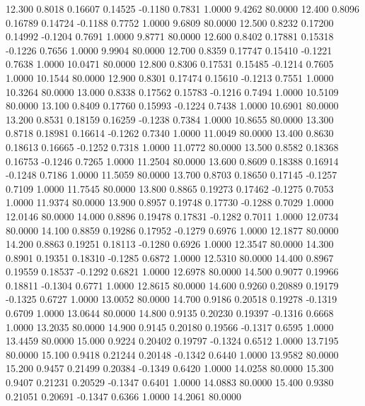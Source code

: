   12.300   0.8018   0.16607   0.14525  -0.1180   0.7831   1.0000   9.4262  80.0000
  12.400   0.8096   0.16789   0.14724  -0.1188   0.7752   1.0000   9.6809  80.0000
  12.500   0.8232   0.17200   0.14992  -0.1204   0.7691   1.0000   9.8771  80.0000
  12.600   0.8402   0.17881   0.15318  -0.1226   0.7656   1.0000   9.9904  80.0000
  12.700   0.8359   0.17747   0.15410  -0.1221   0.7638   1.0000  10.0471  80.0000
  12.800   0.8306   0.17531   0.15485  -0.1214   0.7605   1.0000  10.1544  80.0000
  12.900   0.8301   0.17474   0.15610  -0.1213   0.7551   1.0000  10.3264  80.0000
  13.000   0.8338   0.17562   0.15783  -0.1216   0.7494   1.0000  10.5109  80.0000
  13.100   0.8409   0.17760   0.15993  -0.1224   0.7438   1.0000  10.6901  80.0000
  13.200   0.8531   0.18159   0.16259  -0.1238   0.7384   1.0000  10.8655  80.0000
  13.300   0.8718   0.18981   0.16614  -0.1262   0.7340   1.0000  11.0049  80.0000
  13.400   0.8630   0.18613   0.16665  -0.1252   0.7318   1.0000  11.0772  80.0000
  13.500   0.8582   0.18368   0.16753  -0.1246   0.7265   1.0000  11.2504  80.0000
  13.600   0.8609   0.18388   0.16914  -0.1248   0.7186   1.0000  11.5059  80.0000
  13.700   0.8703   0.18650   0.17145  -0.1257   0.7109   1.0000  11.7545  80.0000
  13.800   0.8865   0.19273   0.17462  -0.1275   0.7053   1.0000  11.9374  80.0000
  13.900   0.8957   0.19748   0.17730  -0.1288   0.7029   1.0000  12.0146  80.0000
  14.000   0.8896   0.19478   0.17831  -0.1282   0.7011   1.0000  12.0734  80.0000
  14.100   0.8859   0.19286   0.17952  -0.1279   0.6976   1.0000  12.1877  80.0000
  14.200   0.8863   0.19251   0.18113  -0.1280   0.6926   1.0000  12.3547  80.0000
  14.300   0.8901   0.19351   0.18310  -0.1285   0.6872   1.0000  12.5310  80.0000
  14.400   0.8967   0.19559   0.18537  -0.1292   0.6821   1.0000  12.6978  80.0000
  14.500   0.9077   0.19966   0.18811  -0.1304   0.6771   1.0000  12.8615  80.0000
  14.600   0.9260   0.20889   0.19179  -0.1325   0.6727   1.0000  13.0052  80.0000
  14.700   0.9186   0.20518   0.19278  -0.1319   0.6709   1.0000  13.0644  80.0000
  14.800   0.9135   0.20230   0.19397  -0.1316   0.6668   1.0000  13.2035  80.0000
  14.900   0.9145   0.20180   0.19566  -0.1317   0.6595   1.0000  13.4459  80.0000
  15.000   0.9224   0.20402   0.19797  -0.1324   0.6512   1.0000  13.7195  80.0000
  15.100   0.9418   0.21244   0.20148  -0.1342   0.6440   1.0000  13.9582  80.0000
  15.200   0.9457   0.21499   0.20384  -0.1349   0.6420   1.0000  14.0258  80.0000
  15.300   0.9407   0.21231   0.20529  -0.1347   0.6401   1.0000  14.0883  80.0000
  15.400   0.9380   0.21051   0.20691  -0.1347   0.6366   1.0000  14.2061  80.0000
